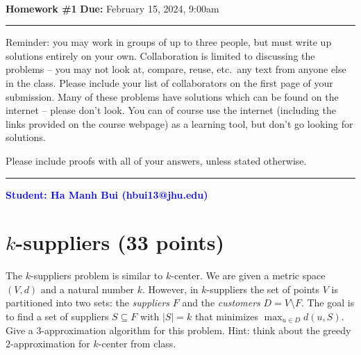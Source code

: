 \documentclass[11pt]{article}
\begin{document}
\\
{{\bf Homework \#1}} \hfill {{\bf Due:} February 15, 2024, 9:00am} \\
\rule[0.1in]{\textwidth}{0.4pt}

Reminder: you may work in groups of up to three people, but must write up solutions entirely on your own.  Collaboration is limited to discussing the problems -- you may not look at, compare, reuse, etc.~any text from anyone else in the class.  Please include your list of collaborators on the first page of your submission.  Many of these problems have solutions which can be found on the internet -- please don't look.  You can of course use the internet (including the links provided on the course webpage) as a learning tool, but don't go looking for solutions.  

Please include proofs with all of your answers, unless stated otherwise.

\noindent \rule[0.1in]{\textwidth}{0.4pt}

\begin{center}
    \textbf{\textcolor{blue}{Student: Ha Manh Bui (hbui13@jhu.edu)}}
\end{center}

\section{$k$-suppliers (33 points)}

The $k$-suppliers problem is similar to $k$-center.  We are given a metric space $(V,d)$ and a natural number $k$.  However,  in $k$-suppliers the set of points $V$ is partitioned into two sets: the \emph{suppliers} $F$ and the \emph{customers} $D = V \setminus F$.  The goal is to find a set of suppliers $S \subseteq F$ with $|S| = k$ that minimizes $\max_{u \in D} d(u,S)$.  Give a $3$-approximation algorithm for this problem.  Hint: think about the greedy $2$-approximation for $k$-center from class.
\end{document}
